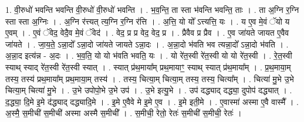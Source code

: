 \documentclass[17pt]{extarticle}
\begin{document}
1. वी॒रुधो॑ भवन्ति भवन्ति वी॒रुधो॑ वी॒रुधो॑ भवन्ति । . भ॒व॒न्ति॒ ता स्ता भ॑वन्ति भवन्ति॒ ताः । . ता अ॒ग्नि र॒ग्नि स्ता स्ता अ॒ग्निः । . अ॒ग्नि र॑त्त्यत् त्य॒ग्नि र॒ग्नि र॑त्ति । . अ॒त्ति॒ यो यो᳚ ऽत्त्यत्ति॒ यः । . य ए॒व मे॒वं ॅयो य ए॒वम् । . ए॒वं ॅवेद॒ वेदै॒व मे॒वं ॅवेद॑ । . वेद॒ प्र प्र वेद॒ वेद॒ प्र । . प्रैवैव प्र प्रैव । . ए॒व जा॑यते जायत ए॒वैव जा॑यते । . जा॒य॒ते॒ ऽन्ना॒दो᳚ ऽन्ना॒दो जा॑यते जायते ऽन्ना॒दः । . अ॒न्ना॒दो भ॑वति भव त्यन्ना॒दो᳚ ऽन्ना॒दो भ॑वति । . अ॒न्ना॒द इत्य॑न्न - अ॒दः । . भ॒व॒ति॒ यो यो भ॑वति भवति॒ यः । . यो रे॑त॒स्वी रे॑त॒स्वी यो यो रे॑त॒स्वी । . रे॒त॒स्वी स्याथ् स्याद् रे॑त॒स्वी रे॑त॒स्वी स्यात् । . स्यात् प्र॑थ॒माया᳚म् प्रथ॒मायाꣳ॒॒ स्याथ् स्यात् प्र॑थ॒माया᳚म् । . प्र॒थ॒माया॒म् तस्य॒ तस्य॑ प्रथ॒माया᳚म् प्रथ॒माया॒म् तस्य॑ । . तस्य॒ चित्या॒म् चित्या॒म् तस्य॒ तस्य॒ चित्या᳚म् । . चित्या॑ मु॒भे उ॒भे चित्या॒म् चित्या॑ मु॒भे । . उ॒भे उपोपो॒भे उ॒भे उप॑ । . उ॒भे इत्यु॒भे । . उप॑ दद्ध्याद् दद्ध्या॒ दुपोप॑ दद्ध्यात् । . द॒द्ध्या॒ दि॒मे इ॒मे द॑द्ध्याद् दद्ध्यादि॒मे । . इ॒मे ए॒वैवे मे इ॒मे ए॒व । . इ॒मे इती॒मे । . ए॒वास्मा॑ अस्मा ए॒वै वास्मै᳚ । . अ॒स्मै॒ स॒मीची॑ स॒मीची॑ अस्मा अस्मै स॒मीची᳚ । . स॒मीची॒ रेतो॒ रेतः॑ स॒मीची॑ स॒मीची॒ रेतः॑ । \newline
\end{document}
